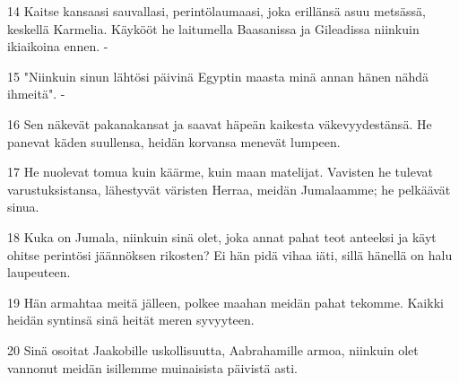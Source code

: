 \par 14 Kaitse kansaasi sauvallasi, perintölaumaasi, joka erillänsä asuu metsässä, keskellä Karmelia. Käykööt he laitumella Baasanissa ja Gileadissa niinkuin ikiaikoina ennen. -
\par 15 "Niinkuin sinun lähtösi päivinä Egyptin maasta minä annan hänen nähdä ihmeitä". -
\par 16 Sen näkevät pakanakansat ja saavat häpeän kaikesta väkevyydestänsä. He panevat käden suullensa, heidän korvansa menevät lumpeen.
\par 17 He nuolevat tomua kuin käärme, kuin maan matelijat. Vavisten he tulevat varustuksistansa, lähestyvät väristen Herraa, meidän Jumalaamme; he pelkäävät sinua.
\par 18 Kuka on Jumala, niinkuin sinä olet, joka annat pahat teot anteeksi ja käyt ohitse perintösi jäännöksen rikosten? Ei hän pidä vihaa iäti, sillä hänellä on halu laupeuteen.
\par 19 Hän armahtaa meitä jälleen, polkee maahan meidän pahat tekomme. Kaikki heidän syntinsä sinä heität meren syvyyteen.
\par 20 Sinä osoitat Jaakobille uskollisuutta, Aabrahamille armoa, niinkuin olet vannonut meidän isillemme muinaisista päivistä asti.


